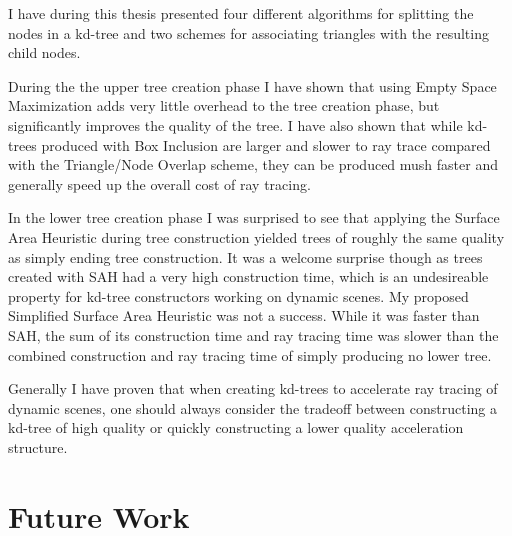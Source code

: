 
I have during this thesis presented four different algorithms for splitting the
nodes in a kd-tree and two schemes for associating triangles with the resulting
child nodes.

During the the upper tree creation phase I have shown that using Empty Space
Maximization adds very little overhead to the tree creation phase, but
significantly improves the quality of the tree. I have also shown that while
kd-trees produced with Box Inclusion are larger and slower to ray trace compared
with the Triangle/Node Overlap scheme, they can be produced mush faster and
generally speed up the overall cost of ray tracing.

In the lower tree creation phase I was surprised to see that applying the
Surface Area Heuristic during tree construction yielded trees of roughly the
same quality as simply ending tree construction. It was a welcome surprise
though as trees created with SAH had a very high construction time, which is an
undesireable property for kd-tree constructors working on dynamic scenes. My
proposed Simplified Surface Area Heuristic was not a success. While it was
faster than SAH, the sum of its construction time and ray tracing time was
slower than the combined construction and ray tracing time of simply producing
no lower tree.



Generally I have proven that when creating kd-trees to accelerate ray tracing of
dynamic scenes, one should always consider the tradeoff between constructing a
kd-tree of high quality or quickly constructing a lower quality acceleration
structure.








\chapter{Future Work}\label{chp:future}

